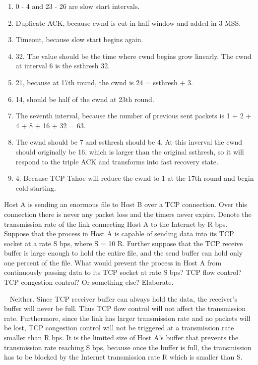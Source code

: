 \begin{exercise}[]
\begin{solution}
  \begin{enumerate}
      \item 0 - 4 and 23 - 26 are slow start intervals.
      \item Duplicate ACK, because cwnd is cut in half window and added in 3 MSS.
      \item Timeout, because slow start begins again.
      \item 32. The value should be the time where cwnd begins grow linearly. The cwnd at interval 6 is the ssthresh 32.
      \item 21, because at 17th round, the cwnd is 24 = ssthresh + 3.
      \item 14, should be half of the cwnd at 23th round.
      \item The seventh interval, because the number of previous sent packets is 1 + 2 + 4 + 8 + 16 + 32 = 63.
      \item The cwnd should be 7 and ssthresh should be 4. At this inverval the cwnd should originally be 16, which is larger than the original ssthresh, so it will respond to the triple ACK and transforms into fast recovery state.
      \item 4. Because TCP Tahoe will reduce the cwnd to 1 at the 17th round and begin cold starting.
  \end{enumerate}
  \end{solution}
  \label{ex7}
\end{exercise}


\begin{exercise}[]{Host A is sending an enormous file to Host B over a TCP connection. Over this connection there is never any packet loss and the timers never expire. Denote the transmission rate of the link connecting Host A to the Internet by R bps. Suppose that the process in Host A is capable of sending data into its TCP socket at a rate S bps, where S = 10 R. Further suppose that the TCP receive buffer is large enough to hold the entire file, and the send buffer can hold only one percent of the file. What would prevent the process in Host A from continuously passing data to its TCP socket at rate S bps? TCP flow control? TCP congestion control? Or something else? Elaborate.}
  \begin{solution}
  \par{~} Neither. Since TCP receiver buffer can always hold the data, the receiver's buffer will never be full. Thus TCP flow control will not affect the transmission rate. Furthermore, since the link has larger transmission rate and no packets will be lost, TCP congestion control will not be triggered at a transmission rate smaller than R bps. It is the limited size of Host A's buffer that prevents the transmission rate reaching S bps, because once the buffer is full, the transmission has to be blocked by the Internet transmission rate R which is smaller than S.
  \end{solution}
  \label{ex8}
\end{exercise}